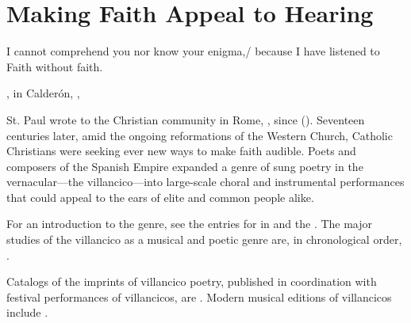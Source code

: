 %

\chapter{Making Faith Appeal to Hearing}

\label{ch:faith-hearing}

\epigraph
{I cannot comprehend you nor know your enigma,/ because I have listened to Faith without faith.}
{, in Calderón, , \textlinenums{13\XXX--\XXX}}

St. Paul wrote to the Christian community in Rome, , since  ().
Seventeen centuries later, amid the ongoing reformations of the Western Church, Catholic Christians were seeking ever new ways to make faith audible.
Poets and composers of the Spanish Empire expanded a genre of sung poetry in the vernacular---the villancico---into large-scale choral and instrumental performances that could appeal to the ears of elite and common people alike.%
\begin{Footnote}
  For an introduction to the genre, see the entries for  in  and the .
  The major studies of the villancico as a musical and poetic genre are, in chronological order, \autocites{Rubio:Forma}{Laird:VC}{Torrente:PhD}{Tenorio:SorJuana}
  {CaberoPueyo:PhD}{Illari:Polychoral}{Knighton-Torrente:VCs}
  {Cashner:Cards}{Cashner:PhD}.

  Catalogs of the imprints of villancico poetry, published in coordination with festival performances of villancicos, are \autocites{BNE:VCs17C}{BNE:VCs18C}{UK:VCs}{US:VCs}. \XXX[Montserrat]
  Modern musical editions of villancicos include \autocites{Cererols:MEM-VC}
  {Stevenson:Christmas}{Ruimonte:Parnaso}{Padilla:Tello}{Ezquerro:MME55}
  {RuizSamaniego:MME63}{Ezquerro:MME59}{Ezquerro:MME65}{Fernandez:Cancionero}
  {Torrejon:VCs}{Cashner:SingingAboutSingingI}.
\end{Footnote}


